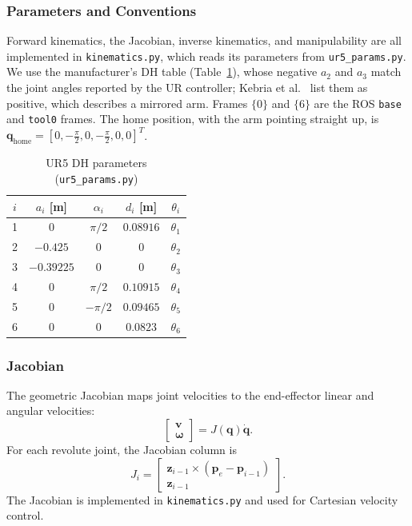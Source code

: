 \documentclass[conference]{IEEEtran}
\begin{document}
\subsubsection{Parameters and Conventions}
Forward kinematics, the Jacobian, inverse kinematics, and manipulability are all implemented in \texttt{kinematics.py}, which reads its parameters from \texttt{ur5\_params.py}. We use the manufacturer's 
DH table (Table~\ref{tab:dh}), whose negative $a_2$ and $a_3$ match the joint angles reported by 
the UR controller; Kebria et al.~\cite{kebria2016} list them as positive, which describes a mirrored 
arm. Frames $\{0\}$ and $\{6\}$ are the ROS \texttt{base} and \texttt{tool0} frames. The home position, 
with the arm pointing straight up, is $\mathbf q_{\text{home}}=[0,-\tfrac{\pi}{2},0,-\tfrac{\pi}{2},0,0]^T$.

\begin{table}[H]
    \caption{UR5 DH parameters (\texttt{ur5\_params.py})}
    \label{tab:dh}
    \centering
    \small
    \begin{tabular}{@{}ccccc@{}}
        \toprule
        $i$ & $a_i$ [m]  & $\alpha_i$ & $d_i$ [m]  & $\theta_i$ \\
        \midrule
        1   & 0          & $\pi/2$    & $0.08916$  & $\theta_1$ \\
        2   & $-0.425$   & 0          & 0          & $\theta_2$ \\
        3   & $-0.39225$ & 0          & 0          & $\theta_3$ \\
        4   & 0          & $\pi/2$    & $0.10915$  & $\theta_4$ \\
        5   & 0          & $-\pi/2$   & $0.09465$  & $\theta_5$ \\
        6   & 0          & 0          & $0.0823$   & $\theta_6$ \\
        \bottomrule
    \end{tabular}
\end{table}

\subsubsection{Jacobian}
The geometric Jacobian maps joint velocities to
the end-effector linear and angular velocities:
\begin{equation}
    \begin{bmatrix}
        \mathbf{v}\\
        \boldsymbol{\omega}
    \end{bmatrix}
    = J(\mathbf{q})\dot{\mathbf{q}}.
\end{equation}
For each revolute joint, the Jacobian column is
\begin{equation}
    J_i =
    \begin{bmatrix}
        \mathbf{z}_{i-1}\times
        (\mathbf{p}_e-\mathbf{p}_{i-1})\\
        \mathbf{z}_{i-1}
    \end{bmatrix}.
\end{equation}
The Jacobian is implemented in
\texttt{kinematics.py} and used for
Cartesian velocity control.
\end{document}
